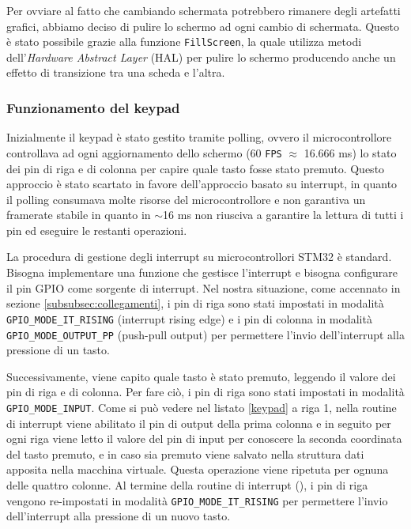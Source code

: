 \documentclass[a4paper]{article}
\begin{document}
Per ovviare al fatto che cambiando schermata potrebbero rimanere degli artefatti grafici, abbiamo
deciso di pulire lo schermo ad ogni cambio di schermata. Questo è stato possibile grazie alla
funzione \texttt{FillScreen}, la quale utilizza metodi dell'\textit{Hardware Abstract Layer} (HAL)
per pulire lo schermo producendo anche un effetto di transizione tra una scheda e l'altra.

\subsubsection{Funzionamento del keypad}\label{subsubsec:keypad}

Inizialmente il keypad è stato gestito tramite polling, ovvero il microcontrollore controllava
ad ogni aggiornamento dello schermo (60 \texttt{FPS} $\approx$ 16.666 ms) lo stato dei pin di riga
e di colonna per capire quale tasto fosse stato premuto. Questo approccio è stato scartato in
favore dell'approccio basato su interrupt, in quanto il polling consumava molte risorse del
microcontrollore e non garantiva un framerate stabile in quanto in $\sim$16 ms non riusciva a
garantire la lettura di tutti i pin ed eseguire le restanti operazioni.

La procedura di gestione degli interrupt su microcontrollori STM32 è standard. Bisogna implementare
una funzione che gestisce l'interrupt e bisogna configurare il pin GPIO come sorgente di interrupt.
Nel nostra situazione, come accennato in sezione \ref{subsubsec:collegamenti}, i pin di riga sono
stati impostati in modalità \texttt{GPIO\_MODE\_IT\_RISING} (interrupt rising edge) e i pin di
colonna in modalità \texttt{GPIO\_MODE\_OUTPUT\_PP} (push-pull output) per permettere l'invio
dell'interrupt alla pressione di un tasto.

Successivamente, viene capito quale tasto è stato premuto, leggendo il valore dei pin
di riga e di colonna. Per fare ciò, i pin di riga sono stati impostati in modalità
\texttt{GPIO\_MODE\_INPUT}. Come si può vedere nel listato \ref{keypad} a riga 1,
nella routine di interrupt viene abilitato il pin di output della prima colonna e in seguito
per ogni riga viene letto il valore del pin di input per conoscere la seconda coordinata
del tasto premuto, e in caso sia premuto viene salvato nella struttura dati apposita
nella macchina virtuale. Questa operazione viene ripetuta per ognuna delle quattro colonne.
Al termine della routine di interrupt
({}),
i pin di riga vengono re-impostati in modalità \texttt{GPIO\_MODE\_IT\_RISING} per permettere
l'invio dell'interrupt alla pressione di un nuovo tasto.
\end{document}
